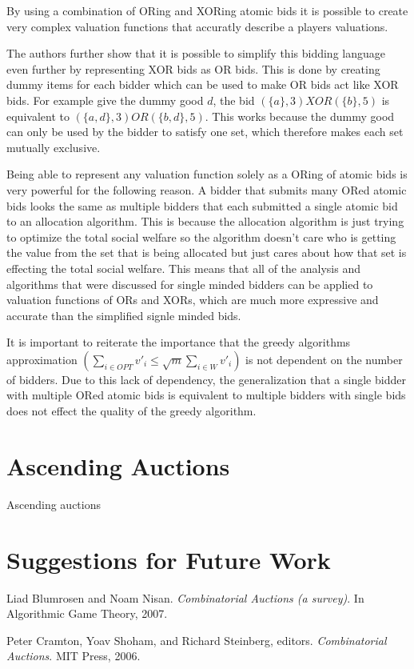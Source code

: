 \documentclass[10pt,onecolumn,letterpaper]{article}
\theoremstyle{definition}
\begin{document}
By using a combination of ORing and XORing atomic bids it is possible to create very complex valuation functions that accuratly describe a players valuations.

The authors further show that it is possible to simplify this bidding language even further by representing XOR bids as OR bids. This is done by creating dummy items for each bidder which can be used to make OR bids act like XOR bids. For example give the dummy good $d$, the bid $(\{a\}, 3) XOR (\{b\}, 5)$ is equivalent to $(\{a,d\}, 3) OR (\{b,d\}, 5)$. This works because the dummy good can only be used by the bidder to satisfy one set, which therefore makes each set mutually exclusive. 

Being able to represent any valuation function solely as a ORing of atomic bids is very powerful for the following reason. A bidder that submits many ORed atomic bids looks the same as multiple bidders that each submitted a single atomic bid to an allocation algorithm. This is because the allocation algorithm is just trying to optimize the total social welfare so the algorithm doesn't care who is getting the value from the set that is being allocated but just cares about how that set is effecting the total social welfare. This means that all of the analysis and algorithms that were discussed for single minded bidders can be applied to valuation functions of ORs and XORs, which are much more expressive and accurate than the simplified signle minded bids. 

It is important to reiterate the importance that the greedy algorithms approximation $(\sum_{i \in OPT} v'_i \leq \sqrt{m} \sum_{i \in W} v'_i)$ is not dependent on the number of bidders. Due to this lack of dependency, the generalization that a single bidder with multiple ORed atomic bids is equivalent to multiple bidders with single bids does not effect the quality of the greedy algorithm.

\section{Ascending Auctions} %

Ascending auctions 

\section{Suggestions for Future Work} %



\begin{thebibliography}{0} %

Liad Blumrosen and Noam Nisan. 
\textit{Combinatorial Auctions (a survey)}. 
In Algorithmic Game Theory, 2007.
 
Peter Cramton, Yoav Shoham, and Richard Steinberg, editors.
\textit{Combinatorial Auctions}. 
MIT Press, 2006.
 
\end{thebibliography}
\end{document}
